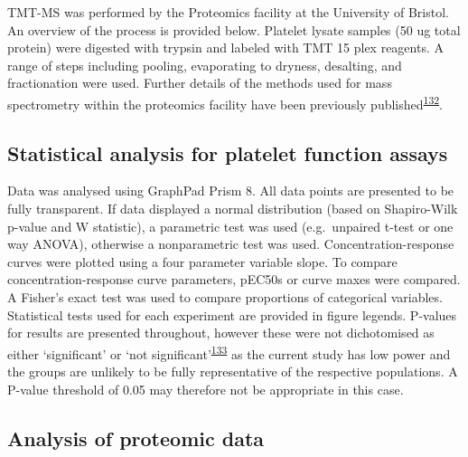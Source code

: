 \documentclass[11pt,twoside]{bristolthesis}
\begin{document}
TMT-MS was performed by the Proteomics facility at the University of Bristol. An overview of the process is provided below. Platelet lysate samples (50 ug total protein) were digested with trypsin and labeled with TMT 15 plex reagents. A range of steps including pooling, evaporating to dryness, desalting, and fractionation were used. Further details of the methods used for mass spectrometry within the proteomics facility have been previously published\textsuperscript{\protect\hyperlink{ref-Durrant2020}{132}}.

\hypertarget{statistical-analysis-for-platelet-function-assays}{%
\subsection{Statistical analysis for platelet function assays}\label{statistical-analysis-for-platelet-function-assays}}

Data was analysed using GraphPad Prism 8. All data points are presented to be fully transparent. If data displayed a normal distribution (based on Shapiro-Wilk p-value and W statistic), a parametric test was used (e.g.~unpaired t-test or one way ANOVA), otherwise a nonparametric test was used. Concentration-response curves were plotted using a four parameter variable slope. To compare concentration-response curve parameters, pEC50s or curve maxes were compared. A Fisher's exact test was used to compare proportions of categorical variables. Statistical tests used for each experiment are provided in figure legends. P-values for results are presented throughout, however these were not dichotomised as either `significant' or `not significant'\textsuperscript{\protect\hyperlink{ref-Sterne2001}{133}} as the current study has low power and the groups are unlikely to be fully representative of the respective populations. A P-value threshold of 0.05 may therefore not be appropriate in this case.

\hypertarget{analysis-of-proteomic-data}{%
\subsection{Analysis of proteomic data}\label{analysis-of-proteomic-data}}
\end{document}
